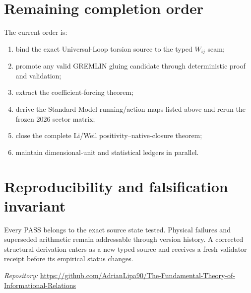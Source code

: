 \section{Remaining completion order}

The current order is:
\begin{enumerate}
  \item bind the exact Universal-Loop torsion source to the typed $W_{ij}$ seam;
  \item promote any valid GREMLIN gluing candidate through deterministic proof
  and validation;
  \item extract the coefficient-forcing theorem;
  \item derive the Standard-Model running/action maps listed above and rerun the
  frozen 2026 sector matrix;
  \item close the complete Li/Weil positivity--native-closure theorem;
  \item maintain dimensional-unit and statistical ledgers in parallel.
\end{enumerate}

\section{Reproducibility and falsification invariant}

Every PASS belongs to the exact source state tested.  Physical failures and
superseded arithmetic remain addressable through version history.  A corrected
structural derivation enters as a new typed source and receives a fresh
validator receipt before its empirical status changes.

\vfill
\noindent\small\textit{Repository:}
\url{https://github.com/AdrianLipa90/The-Fundamental-Theory-of-Informational-Relations}
